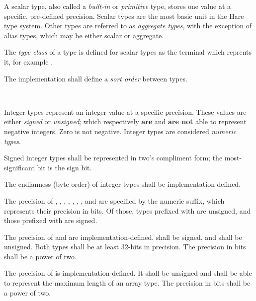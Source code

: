 \specsubitem
A scalar type, also called a \textit{built-in} or \textit{primitive} type,
stores one value at a specific, pre-defined precision. Scalar types are the
most basic unit in the Hare type system. Other types are referred to as
\textit{aggregate types}, with the exception of alias types, which may be
either scalar or aggregate.

\specsubitem
The \textit{type class} of a type is defined for scalar types as the terminal
which reprents it, for example .

\specsubitem
The implementation shall define a \textit{sort order} between types.


\begin{grammar}
\oneof \\
\end{grammar}

\specsubsubitem
Integer types represent an integer value at a specific precision. These values
are either \textit{signed} or \textit{unsigned}; which respectively
\textbf{are} and \textbf{are not} able to represent negative integers. Zero is
not negative. Integer types are considered \textit{numeric types}.

\specsubsubitem
Signed integer types shall be represented in two's compliment form; the
most-significant bit is the sign bit.

\specsubsubitem
The endianness (byte order) of integer types shall be implementation-defined.

\specsubsubitem
The precision of , , ,
, , , , and
 are specified by the numeric suffix, which represents their
precision in bits. Of those, types prefixed with  are unsigned, and
those prefixed with  are signed.

\specsubsubitem
The precision of  and  are
implementation-defined.  shall be signed, and
 shall be unsigned. Both types shall be at least 32-bits in
precision. The precision in bits shall be a power of two.

\specsubsubitem
The precision of  is implementation-defined. It shall be
unsigned and shall be able to represent the maximum length of an array type.
The precision in bits shall be a power of two.

